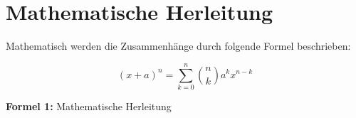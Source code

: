 \section{Mathematische Herleitung}

Mathematisch werden die Zusammenhänge durch folgende Formel beschrieben:

\begin{equation}
    (x + a)^n = \sum_{k=0}^{n} \binom{n}{k} a^k x^{n-k}
\end{equation}

\textbf{Formel 1:} Mathematische Herleitung
